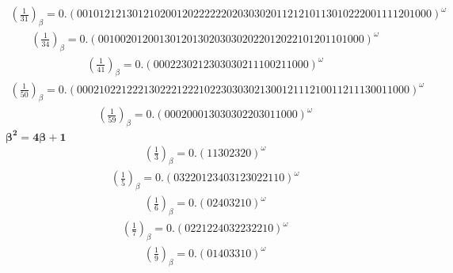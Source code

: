 \documentclass[fleqn]{article}
\begin{document}
\begin{equation*}
\begin{split}
(\frac{1}{31})_\beta = 0.(0010121213012102001202222220203030201121210113010222001111201000)^\omega
\end{split}\end{equation*}
\begin{equation*}
\begin{split}
(\frac{1}{34})_\beta = 0.(001002012001301201302030302022012022101201101000)^\omega
\end{split}\end{equation*}
\begin{equation*}
\begin{split}
(\frac{1}{41})_\beta = 0.(0002230212303030211100211000)^\omega
\end{split}\end{equation*}
\begin{equation*}
\begin{split}
(\frac{1}{50})_\beta = 0.(000210221222130222122210223030302130012111210011211130011000)^\omega
\end{split}\end{equation*}
\begin{equation*}
\begin{split}
(\frac{1}{59})_\beta = 0.(000200013030302203011000)^\omega
\end{split}\end{equation*}
$\boldsymbol{\beta^2 = 4\beta + 1}$
\begin{equation*}
\begin{split}
(\frac{1}{3})_\beta = 0.(11302320)^\omega
\end{split}\end{equation*}
\begin{equation*}
\begin{split}
(\frac{1}{5})_\beta = 0.(03220123403123022110)^\omega
\end{split}\end{equation*}
\begin{equation*}
\begin{split}
(\frac{1}{6})_\beta = 0.(02403210)^\omega
\end{split}\end{equation*}
\begin{equation*}
\begin{split}
(\frac{1}{7})_\beta = 0.(0221224032232210)^\omega
\end{split}\end{equation*}
\begin{equation*}
\begin{split}
(\frac{1}{9})_\beta = 0.(01403310)^\omega
\end{split}\end{equation*}
\end{document}
